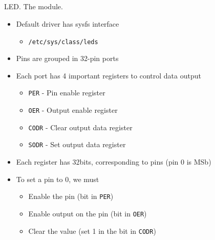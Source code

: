\documentclass{workshop}
\begin{document}
\subsection{}
\begin{frame}{LED. The module.}
	\begin{itemize}
		\item Default driver has sysfs interface
			\begin{itemize}
				\item \texttt{/etc/sys/class/leds}
			\end{itemize}
		\item Pins are grouped in 32-pin ports
		\item Each port has 4 important registers to control data output
			\begin{itemize}
				\item \texttt{PER} - Pin enable register
				\item \texttt{OER} - Output enable register
				\item \texttt{CODR} - Clear output data register
				\item \texttt{SODR} - Set output data register
			\end{itemize}
		\item Each register has 32bits, corresponding to pins (pin 0 is MSb)
		\item To set a pin to 0, we must
			\begin{itemize}
				\item Enable the pin (bit in \texttt{PER})
				\item Enable output on the pin (bit in \texttt{OER})
				\item Clear the value (set 1 in the bit in \texttt{CODR})
			\end{itemize}
	\end{itemize}
\end{frame}
\end{document}

